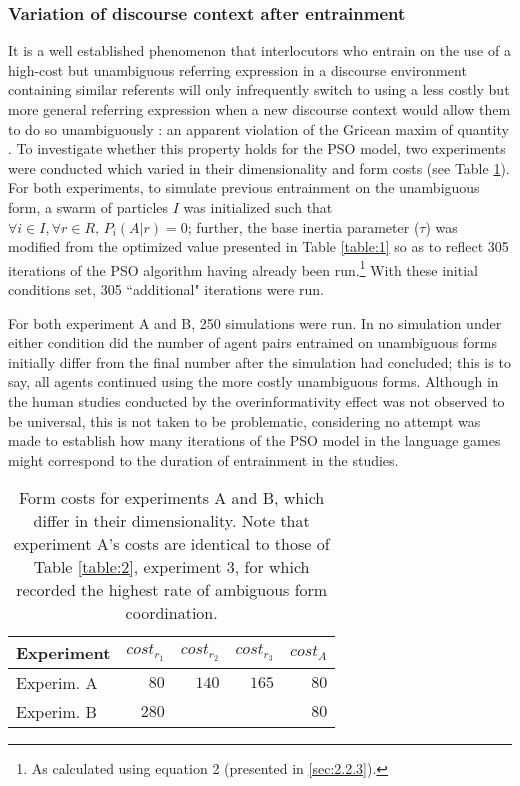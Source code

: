 \documentclass[11pt]{article}
\begin{document}
\subsubsection{Variation of discourse context after entrainment}
It is a well established phenomenon that interlocutors who entrain on the use of a high-cost but unambiguous referring expression in a discourse environment containing similar referents will only infrequently switch to using a less costly but more general referring expression when a new discourse context would allow them to do so unambiguously \citep{brennan1996}: an apparent violation of the Gricean maxim of quantity \citep{grice1975}. To investigate whether this property holds for the PSO model, two experiments were conducted which varied in their dimensionality and form costs (see Table \ref{table:4}). For both experiments, to simulate previous entrainment on the unambiguous form, a swarm of particles $I$ was initialized such that $\forall i \in I, \forall r \in R,\, P_i(A|r) = 0$; further, the base inertia parameter ($\tau$) was modified from the optimized value presented in Table \ref{table:1} so as to reflect 305 iterations of the PSO algorithm having already been run.\footnote{As calculated using equation 2 (presented in \ref{sec:2.2.3}).} With these initial conditions set, 305 ``additional" iterations were run.

For both experiment A and B, 250 simulations were run. In no simulation under either condition did the number of agent pairs entrained on unambiguous forms initially differ from the final number after the simulation had concluded; this is to say, all agents continued using the more costly unambiguous forms. Although in the human studies conducted by \citeauthor{brennan1996} the overinformativity effect was not observed to be universal, this is not taken to be problematic, considering no attempt was made to establish how many iterations of the PSO model in the \citeauthor{rohde2012} language games might correspond to the duration of entrainment in the \citeauthor{brennan1996} studies. 

\begin{table}
\begin{center}
    \begin{tabular}{ l r r r r }
    Experiment & $cost_{r_1}$ & $cost_{r_2}$ & $cost_{r_3}$ & $cost_A$\\ \hline
    Experim. A & $80$  & $140$ & $165$ & $80$ \\ \hline
    Experim. B & $280$ &       &       & $80$ \\ \hline
    \end{tabular}
    \caption{Form costs for experiments A and B, which differ in their dimensionality. Note that experiment A's costs are identical to those of Table \ref{table:2}, experiment 3, for which \citeauthor{rohde2012} recorded the highest rate of ambiguous form coordination.}
    \label{table:4}
\end{center}
\end{table}
\end{document}
